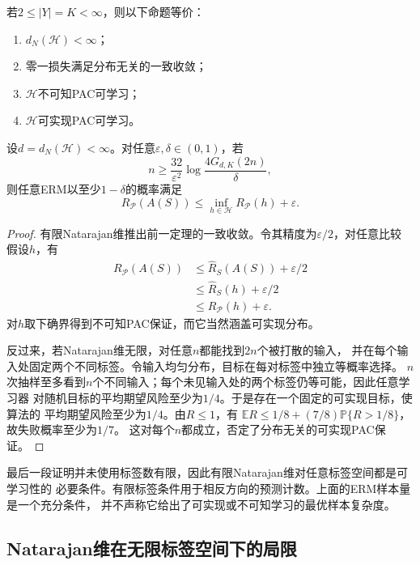 \begin{theorem}[有限标签的可学习性刻画]
\label{thm:finite-label-learnability}
若$2\leq|Y|=K<\infty$，则以下命题等价：
\begin{enumerate}
 \item $d_N(\mathcal H)<\infty$；
 \item 零一损失满足分布无关的一致收敛；
 \item $\mathcal H$不可知PAC可学习；
 \item $\mathcal H$可实现PAC可学习。
\end{enumerate}

设$d=d_N(\mathcal H)<\infty$。对任意$\varepsilon,\delta\in(0,1)$，若
\[
 n\geq\frac{32}{\varepsilon^2}\log\frac{4G_{d,K}(2n)}{\delta},
\]
则任意ERM以至少$1-\delta$的概率满足
\[
 R_{\mathcal P}(A(S))\leq\inf_{h\in\mathcal H}R_{\mathcal P}(h)+\varepsilon.
\]
\end{theorem}

\begin{proof}
有限Natarajan维推出前一定理的一致收敛。令其精度为$\varepsilon/2$，对任意比较
假设$h$，有
\begin{align*}
 R_{\mathcal P}(A(S))&\leq\hat R_S(A(S))+\varepsilon/2\\
 &\leq\hat R_S(h)+\varepsilon/2\\
 &\leq R_{\mathcal P}(h)+\varepsilon.
\end{align*}
对$h$取下确界得到不可知PAC保证，而它当然涵盖可实现分布。

反过来，若Natarajan维无限，对任意$n$都能找到$2n$个被打散的输入，
并在每个输入处固定两个不同标签。令输入均匀分布，目标在每对标签中独立等概率选择。
$n$次抽样至多看到$n$个不同输入；每个未见输入处的两个标签仍等可能，因此任意学习器
对随机目标的平均期望风险至少为$1/4$。于是存在一个固定的可实现目标，使算法的
平均期望风险至少为$1/4$。由$R\leq1$，有
$\mathbb E R\leq1/8+(7/8)\mathbb P\{R>1/8\}$，故失败概率至少为$1/7$。
这对每个$n$都成立，否定了分布无关的可实现PAC保证。
\end{proof}

最后一段证明并未使用标签数有限，因此有限Natarajan维对任意标签空间都是可学习性的
必要条件。有限标签条件用于相反方向的预测计数。上面的ERM样本量是一个充分条件，
并不声称它给出了可实现或不可知学习的最优样本复杂度。

\subsection{Natarajan维在无限标签空间下的局限}
\label{sec:multiclass-erm-limitations}

